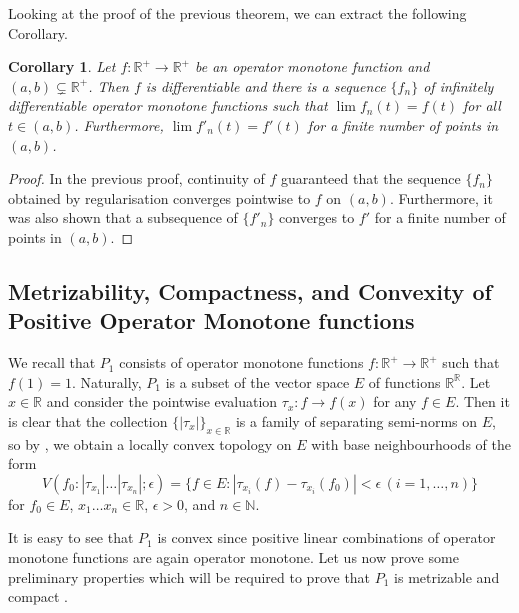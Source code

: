 \documentclass[12pt,a4paper]{amsart}
\newtheorem{corollary}[theorem]{Corollary}
\theoremstyle{definition}
\newcommand{\myabs}[1]{ | #1 | }
\begin{document}
	
	Looking at the proof of the previous theorem, we can extract the following Corollary.
	\begin{corollary}\label{regularisation-gives-infinitely-differentiable-functions-converging-pointwise}
		Let $f: \mathbb{R}^{+} \rightarrow \mathbb{R}^{+}$ be an operator monotone function and $(a, b ) \subsetneq \mathbb{R}^{+}$. Then $f$ is differentiable and there is a sequence $\lbrace f_n \rbrace$ of infinitely differentiable operator monotone functions such that $\lim f_n(t) = f(t)$ for all $t \in (a, b)$. Furthermore, $\lim f'_n(t) = f'(t)$ for a finite number of points in $(a,b)$.
	\end{corollary}
	\begin{proof}
		In the previous proof, continuity of $f$ guaranteed that the sequence $\lbrace f_n \rbrace$ obtained by regularisation converges pointwise to $f$ on $(a,b)$. Furthermore, it was also shown that a subsequence of $\lbrace f'_n \rbrace$ converges to $f'$ for a finite number of points in $(a, b)$.
	\end{proof}
	
	
	\subsection{Metrizability, Compactness, and Convexity of Positive Operator Monotone functions}
	We recall that $P_1$ consists of operator monotone functions $f: \mathbb{R}^{+} \rightarrow \mathbb{R}^{+}$ such that $f(1) = 1$. Naturally, $P_1$ is a subset of the vector space $E$ of functions $\mathbb{R}^{\mathbb{R}}$. Let $x \in \mathbb{R}$ and consider the pointwise evaluation $\tau_{x}: f \rightarrow f(x)$ for any $f \in E$. Then it is clear that the collection $\lbrace \myabs{\tau_{x}} \rbrace_{x \in \mathbb{R}}$ is a family of separating semi-norms on $E$, so by \cite[Theorem 1.2.6]{kadison-vol-1}, we obtain a locally convex topology on $E$ with base neighbourhoods of the form 
	\begin{equation}\label{locally-convex-neighbourhoods}
		V(f_0: \myabs{\tau_{x_1}} \ldots \myabs{\tau_{x_n}}; \epsilon) = \lbrace f \in E : \myabs{\tau_{x_i}(f) - \tau_{x_i}(f_0)} < \epsilon \, (i = 1, \ldots, n ) \rbrace 
	\end{equation}
	for $f_0 \in E$, $x_1 \ldots x_n \in \mathbb{R}$, $\epsilon > 0$, and $n \in \mathbb{N}$.
	
	It is easy to see that $P_1$ is convex since positive linear combinations of operator monotone functions are again operator monotone. Let us now prove some preliminary properties which will be required to prove that $P_1$ is metrizable and compact \cite[Proposition 28.7]{barry-simon}.
	
\end{document}
